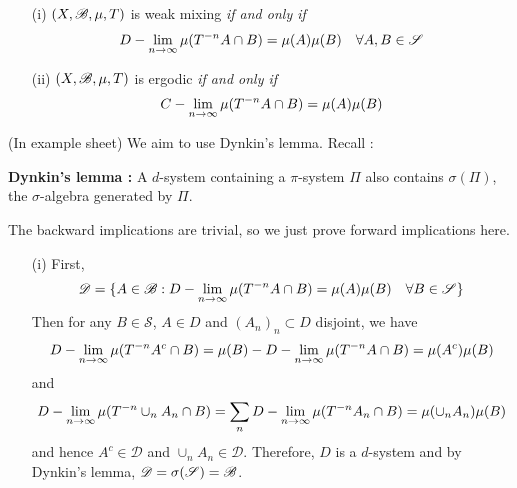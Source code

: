 \documentclass[10pt,a4paper]{report}
\newenvironment{proof}
{\begin{changemargin}{1cm}{0.5cm} 
	}%
	{\end{changemargin}
}
\newenvironment{subproof}
{\begin{changemargin}{0.5cm}{0.5cm}
	}%
	{\end{changemargin}
}
\begin{document}
\begin{itemize}
\item[(i)] $(X,\mathscr{B}, \mu, T)$ is weak mixing \emph{if and only if}
\begin{align*}
D-\lim_{n\rightarrow \infty} \mu(T^{-n} A \cap B) = \mu(A) \mu(B) \quad \forall A,B \in \mathscr{S}
\end{align*}
\item[(ii)] $(X,\mathscr{B}, \mu, T)$ is ergodic \emph{if and only if}
\begin{align*}
C-\lim_{n\rightarrow \infty} \mu(T^{-n}A \cap B) = \mu(A) \mu(B)
\end{align*}
\end{itemize}
\begin{proof}
\pf (In example sheet) We aim to use Dynkin's lemma. Recall :
\begin{subproof}
\textbf{Dynkin's lemma :} A $d$-system containing a $\pi$-system $\Pi$ also contains $\sigma(\Pi)$, the $\sigma$-algebra generated by $\Pi$.
\end{subproof}
The backward implications are trivial, so we just prove forward implications here.
\begin{itemize}
\item[(i)] First,
\begin{align*}
\mathscr{D} = \{A\in \mathscr{B} : D-\lim_{n\rightarrow \infty} \mu(T^{-n} A \cap B) = \mu(A) \mu(B) \quad \forall B\in \mathscr{S} \}
\end{align*}
Then for any $B\in \mathscr{S}$, $A\in D$ and $(A_n)_{n} \subset D$ disjoint, we have
\begin{align*}
D-\lim_{n\rightarrow \infty} \mu(T^{-n} A^c \cap B) = \mu(B) - D-\lim_{n\rightarrow \infty} \mu(T^{-n} A \cap B) = \mu(A^c) \mu(B)
\end{align*}
and
\begin{align*}
D-\lim_{n\rightarrow \infty} \mu(T^{-n} \cup_n A_n \cap B) = \sum_n D-\lim_{n\rightarrow \infty} \mu(T^{-n} A_n \cap B) = \mu(\cup_n A_n) \mu(B)
\end{align*}
and hence $A^c \in \mathscr{D}$ and $\cup_n A_n \in \mathscr{D}$. Therefore, $D$ is a $d$-system and by Dynkin's lemma, $\mathscr{D} = \sigma(\mathscr{S}) = \mathscr{B}$.


\end{itemize}
\end{proof}
\end{document}
